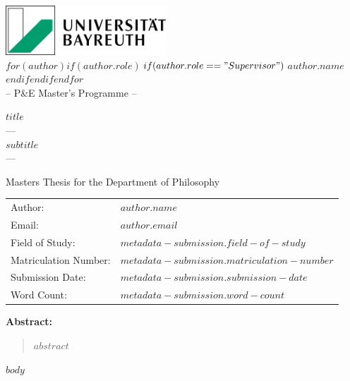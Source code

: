 \documentclass[12pt,a4paper]{report}
\newcommand{\subtitle}{$subtitle$}
\newcommand{\supervisor}{$for(author)$$if(author.role)$$if(author.role=="Supervisor")$$author.name$$endif$$endif$$endfor$}
\newcommand{\fieldofstudy}{$metadata-submission.field-of-study$}
\newcommand{\matriculationnumber}{$metadata-submission.matriculation-number$}
\newcommand{\submissiondate}{$metadata-submission.submission-date$}
\newcommand{\wordcount}{$metadata-submission.word-count$}
\begin{document}
\begin{titlepage}
  \begin{center}
    \includegraphics[width=6cm]{latex/uni-bayreuth-logo.png}\\[1cm]
    {\Large \supervisor}\\[0.5cm]
    {\large -- P\&E Master's Programme --}\\[2cm]
  \end{center}

  \begin{center}
    \LARGE\textbf{$title$}\\[1cm]
    {\large --- \\[0.5cm] \subtitle \\[0.5cm] ---}\\[2cm]
  \end{center}
  
  \begin{center}
    \large Masters Thesis for the Department of Philosophy
  \end{center}
  
  \vspace{1.5cm}
  
  \begin{center}
    \begin{tabular}{ll}
      \toprule
      Author: & $author.name$ \\
      Email: & $author.email$ \\
      Field of Study: & \fieldofstudy \\
      Matriculation Number: & \matriculationnumber \\
      Submission Date: & \submissiondate \\
      Word Count: & \wordcount \\
      \bottomrule
    \end{tabular}
  \end{center}
  
  \vspace{2cm}
  
  \begin{center}
    \large\textbf{Abstract:}
  \end{center}
  
  \begin{quotation}
    $abstract$
  \end{quotation}
\end{titlepage}

$body$
\end{document}
